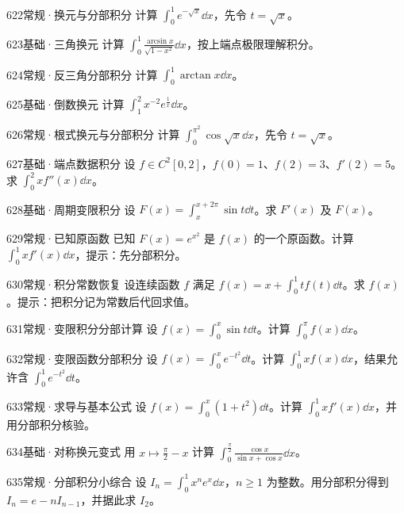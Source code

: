 \begin{exercise}{622}{常规·换元与分部积分}
计算 $\int_0^1e^{-\sqrt x}\dd x$，先令 $t=\sqrt x$。
\end{exercise}
\begin{exercise}{623}{基础·三角换元}
计算 $\int_0^1\frac{\arcsin x}{\sqrt{1-x^2}}\dd x$，按上端点极限理解积分。
\end{exercise}
\begin{exercise}{624}{常规·反三角分部积分}
计算 $\int_0^1\arctan x\dd x$。
\end{exercise}
\begin{exercise}{625}{基础·倒数换元}
计算 $\int_1^2x^{-2}e^{\frac{1}{x}}\dd x$。
\end{exercise}
\begin{exercise}{626}{常规·根式换元与分部积分}
计算 $\int_0^{\pi^2}\cos\sqrt x\dd x$，先令 $t=\sqrt x$。
\end{exercise}
\begin{exercise}{627}{基础·端点数据积分}
设 $f\in C^2[0,2]$，$f(0)=1$、$f(2)=3$、$f'(2)=5$。求 $\int_0^2xf''(x)\dd x$。
\end{exercise}
\begin{exercise}{628}{基础·周期变限积分}
设 $F(x)=\int_x^{x+2\pi}\sin t\dd t$。求 $F'(x)$ 及 $F(x)$。
\end{exercise}
\begin{exercise}{629}{常规·已知原函数}
已知 $F(x)=e^{x^2}$ 是 $f(x)$ 的一个原函数。计算 $\int_0^1xf'(x)\dd x$，提示：先分部积分。
\end{exercise}
\begin{exercise}{630}{常规·积分常数恢复}
设连续函数 $f$ 满足 $f(x)=x+\int_0^1tf(t)\dd t$。求 $f(x)$。提示：把积分记为常数后代回求值。
\end{exercise}
\begin{exercise}{631}{常规·变限积分分部计算}
设 $f(x)=\int_0^x\sin t\dd t$。计算 $\int_0^\pi f(x)\dd x$。
\end{exercise}
\begin{exercise}{632}{常规·变限函数分部积分}
设 $f(x)=\int_0^xe^{-t^2}\dd t$。计算 $\int_0^1xf(x)\dd x$，结果允许含 $\int_0^1e^{-t^2}\dd t$。
\end{exercise}
\begin{exercise}{633}{常规·求导与基本公式}
设 $f(x)=\int_0^x(1+t^2)\dd t$。计算 $\int_0^1xf'(x)\dd x$，并用分部积分核验。
\end{exercise}
\begin{exercise}{634}{基础·对称换元变式}
用 $x\mapsto\frac{\pi}{2}-x$ 计算 $\int_0^{\frac{\pi}{2}}\frac{\cos x}{\sin x+\cos x}\dd x$。
\end{exercise}
\begin{exercise}{635}{常规·分部积分小综合}
设 $I_n=\int_0^1x^ne^x\dd x$，$n\ge1$ 为整数。用分部积分得到 $I_n=e-nI_{n-1}$，并据此求 $I_2$。
\end{exercise}
